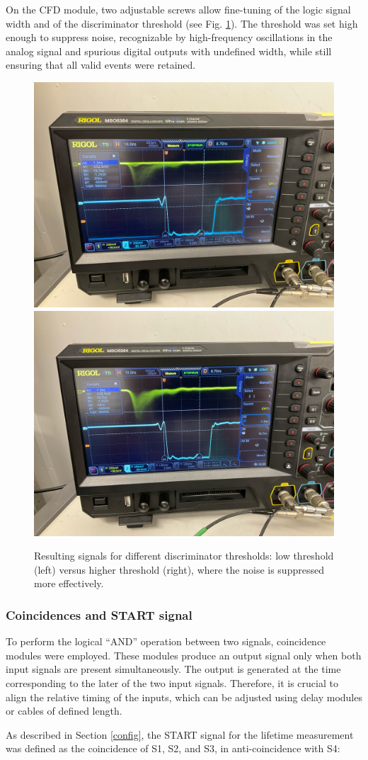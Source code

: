 \documentclass[11pt,a4paper]{article}
\begin{document}
On the CFD module, two adjustable screws allow fine-tuning of the logic signal width and of the discriminator threshold (see Fig. \ref{Threshold}). The threshold was set high enough to suppress noise, recognizable by high-frequency oscillations in the analog signal and spurious digital outputs with undefined width, while still ensuring that all valid events were retained.


\begin{figure}[h]
    \centering
    \includegraphics[width=0.48\linewidth]{Low thr.jpg}
    \includegraphics[width=0.48\linewidth]{High thr.jpg}
    \caption{Resulting signals for different discriminator thresholds: low threshold (left) versus higher threshold (right), where the noise is suppressed more effectively.}
    \label{Threshold}
\end{figure}

\subsubsection{Coincidences and START signal}

To perform the logical “AND” operation between two signals, coincidence modules were employed. These modules produce an output signal only when both input signals are present simultaneously. The output is generated at the time corresponding to the later of the two input signals. Therefore, it is crucial to align the relative timing of the inputs, which can be adjusted using delay modules or cables of defined length.  

As described in Section \ref{config}, the START signal for the lifetime measurement was defined as the coincidence of S1, S2, and S3, in anti-coincidence with S4:
\end{document}
